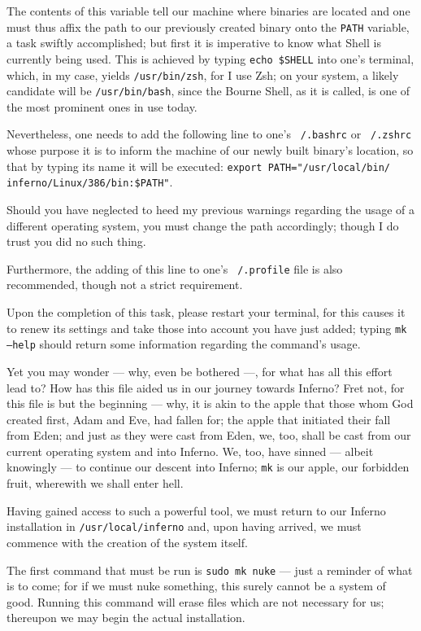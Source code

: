 \documentclass[a5paper,twoside,12pt]{report}
\begin{document}
The contents of this variable tell our machine where binaries are located and one must thus affix the path to our previously created binary onto the \texttt{PATH} variable, a task swiftly accomplished; but first it is imperative to know what Shell is currently being used. This is achieved by typing \texttt{echo \$SHELL} into one's terminal, which, in my case, yields \texttt{/usr/bin/zsh}, for I use Zsh; on your system, a likely candidate will be \texttt{/usr/bin/bash}, since the Bourne Shell, as it is called, is one of the most prominent ones in use today.

Nevertheless, one needs to add the following line to one's \texttt{~/.bashrc} or \texttt{~/.zshrc} whose purpose it is to inform the machine of our newly built binary's location, so that by typing its name it will be executed: \texttt{export PATH="/usr/local/bin/\\inferno/Linux/386/bin:\$PATH"}.

Should you have neglected to heed my previous warnings regarding the usage of a different operating system, you must change the path accordingly; though I do trust you did no such thing.

Furthermore, the adding of this line to one's \texttt{~/.profile} file is also recommended, though not a strict requirement.

Upon the completion of this task, please restart your terminal, for this causes it to renew its settings and take those into account you have just added; typing \texttt{mk --help} should return some information regarding the command's usage.

Yet you may wonder — why, even be bothered —, for what has all this effort lead to? How has this file aided us in our journey towards Inferno? Fret not, for this file is but the beginning — why, it is akin to the apple that those whom God created first, Adam and Eve, had fallen for; the apple that initiated their fall from Eden; and just as they were cast from Eden, we, too, shall be cast from our current operating system and into Inferno. We, too, have sinned — albeit knowingly — to continue our descent into Inferno; \texttt{mk} is our apple, our forbidden fruit, wherewith we shall enter hell.

Having gained access to such a powerful tool, we must return to our Inferno installation in \texttt{/usr/local/inferno} and, upon having arrived, we must commence with the creation of the system itself.

The first command that must be run is \texttt{sudo mk nuke} — just a reminder of what is to come; for if we must nuke something, this surely cannot be a system of good. Running this command will erase files which are not necessary for us; thereupon we may begin the actual installation.
\end{document}
